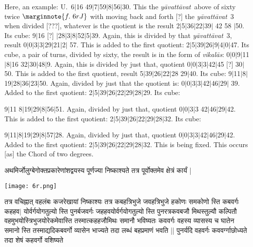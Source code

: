 \documentclass[12pt]{book}
\def\ya{\textit{y\=avat\-t\=avat}}
\def\vikalas{\textit{vi\-ka\-l\=as}}
\def\danda{$|$}
\begin{document}
\newpage

Here, an example: U.\ 6\danda 16  49\danda 7\danda 59\danda 8\danda 56\danda 30. 
This the \ya\ above of sixty twice
$\marginnote{f.~6r J} $
with moving back and forth [?] the \ya\ 3 when divided [???],
whatever is the quotient is the result 2\danda 5\danda 36\danda 22\danda 39\danda
42 58 \danda 50. Its cube: 9\danda 16 [?] \danda 28\danda 3\danda 8\danda 52\danda 5\danda 39.
Again, this is divided by that \ya\ 3, result 0\danda 0\danda 3\danda 3\danda 29\danda 21\danda 2\danda 
57. This is added to the first quotient: 2\danda 5\danda 39\danda 26\danda 9\danda 4\danda 0\danda 47.
Its cube, a pair of turns, divided by sixty, the result is in the form of \vikalas: 
0\danda 0\danda 9\danda 11\danda 8\danda 16 32\danda 30\danda 48\danda 9.
Again, this is divided by just that, quotient 0\danda 0\danda 3\danda 3\danda 42\danda 45 [?]
30\danda 50. This is added to the first quotient, result 5\danda 39\danda 26\danda 22\danda 28
29\danda 40. Its cube: 9\danda 11\danda 8\danda 19\danda 28\danda 36\danda 23\danda 50.
Again, divided by just that the quotient is: 0\danda 0\danda 3\danda 3\danda 42\danda 46\danda 29\danda
39. Added to the first quotient: 2\danda 5\danda 39\danda 26\danda 22\danda 29\danda 28\danda 29. 
Its cube: 

9\danda 11 8\danda 19\danda 29\danda 8\danda 56\danda 51. Again, divided by just that,
quotient 0\danda 0\danda 3\danda 3 42\danda 46\danda 29\danda 42. This is added to the first 
quotient: 2\danda 5\danda 39\danda 26\danda 22\danda 29\danda 28\danda 32. Its cube: 

9\danda 11\danda 8\danda 19\danda 29\danda 8\danda 57\danda 28. Again, divided by just that,
quotient 0\danda 0\danda 3\danda 3\danda 42\danda 46\danda 29\danda 42. 
Added to the first quotient: 2\danda 5\danda 39\danda 26\danda 22\danda 29\danda 28\danda 32.
This is being fixed. This occurs [as] the Chord of two degrees.

\newpage

{\s अथमिर्जोलुग्बेगोक्तप्रकारेणांशद्वयस्य पूर्णज्या निष्काश्यते तत्र पूर्वोक्तमेव क्षेत्रं
कार्यं |} \\ 

\begin{center}
\texttt{[image: 6r.png]}
\end{center}
 
{\s तत्र वचिह्नात् वहलंबः कजरेखायां निष्काश्यः तत्र कबहत्रिभुजे जवहत्रिभुजे हकोणः समकोणो स्ति कबवर्गः कहहव$|$
योर्वर्गयोगतुल्यो स्ति पुनर्बजवर्गः जहहवयोर्वर्गयोगतुल्यो स्ति
पुनरत्रकवबजौ मिथस्तुल्यौ कल्पितौ वहमुभ\-योस्त्रिभुजयोरेकमेवास्ति तस्मात्कहहजौमिथः समानौ भविष्यतः कववर्गः वहस्य व्यासस्य च घातेन समानो स्ति तस्माद्यदिकबवर्गो व्यासेन भाज्यते तदा लब्धं बहप्रमाणं भवति ||
पुनर्यदि वहवर्गः कववर्ग्गाछोध्यते तदा शेषं कहवर्गो वशिष्यते } 
\end{document}
